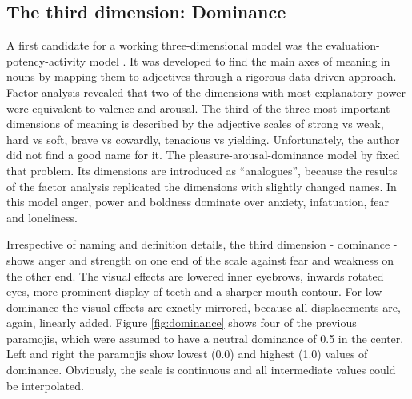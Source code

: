 \documentclass[conference]{IEEEtran}
\begin{document}
\subsection{The third dimension: Dominance}

A first candidate for a working three-dimensional model was the evaluation-potency-activity model \cite{potency_osgood}.
It was developed to find the main axes of meaning in nouns by mapping them to adjectives through a rigorous data driven approach.
Factor analysis revealed that two of the dimensions with most explanatory power were equivalent to valence and arousal.
The third of the three most important dimensions of meaning is described by the adjective scales of strong vs weak,
hard vs soft, brave vs cowardly, tenacious vs yielding.
Unfortunately, the author did not find a good name for it.
The pleasure-arousal-dominance model by \cite{dominance_mehrabian} fixed that problem. Its dimensions are
introduced as ``analogues'', because the results of the factor analysis replicated the dimensions with slightly changed names.
In this model anger, power and boldness dominate over anxiety, infatuation, fear and loneliness.

Irrespective of naming and definition details, the third dimension - dominance - shows anger and strength 
on one end of the scale against fear and weakness  on the other end.
The visual effects are lowered inner eyebrows, inwards rotated eyes, more prominent display of teeth and a sharper mouth contour.
For low dominance the visual effects are exactly mirrored, because all displacements are, again, linearly added.
Figure \ref{fig:dominance} shows four of the previous paramojis, which were assumed to have a neutral dominance of 0.5 in the center.
Left and right the paramojis show lowest (0.0) and highest (1.0) values of dominance.
Obviously, the scale is continuous and all intermediate values could be interpolated.
\end{document}
